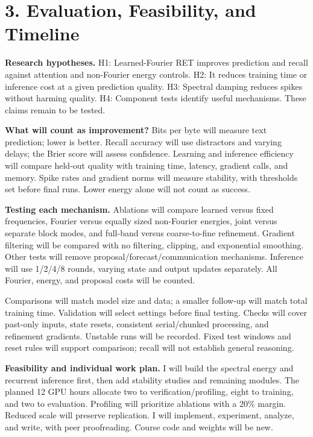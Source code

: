 \documentclass[11pt,letterpaper]{article}
\begin{document}
\newpage
\section*{3. Evaluation, Feasibility, and Timeline}

\textbf{Research hypotheses.} H1: Learned-Fourier RET improves prediction and recall against attention and non-Fourier energy controls. H2: It reduces training time or inference cost at a given prediction quality. H3: Spectral damping reduces spikes without harming quality. H4: Component tests identify useful mechanisms. These claims remain to be tested.

\textbf{What will count as improvement?} Bits per byte will measure text prediction; lower is better. Recall accuracy will use distractors and varying delays; the Brier score will assess confidence. Learning and inference efficiency will compare held-out quality with training time, latency, gradient calls, and memory. Spike rates and gradient norms will measure stability, with thresholds set before final runs. Lower energy alone will not count as success.

\textbf{Testing each mechanism.} Ablations will compare learned versus fixed frequencies, Fourier versus equally sized non-Fourier energies, joint versus separate block modes, and full-band versus coarse-to-fine refinement. Gradient filtering will be compared with no filtering, clipping, and exponential smoothing. Other tests will remove proposal/forecast/communication mechanisms. Inference will use 1/2/4/8 rounds, varying state and output updates separately. All Fourier, energy, and proposal costs will be counted.

Comparisons will match model size and data; a smaller follow-up will match total training time. Validation will select settings before final testing. Checks will cover past-only inputs, state resets, consistent serial/chunked processing, and refinement gradients. Unstable runs will be recorded. Fixed test windows and reset rules will support comparison; recall will not establish general reasoning.

\textbf{Feasibility and individual work plan.} I will build the spectral energy and recurrent inference first, then add stability studies and remaining modules. The planned 12 GPU hours allocate two to verification/profiling, eight to training, and two to evaluation. Profiling will prioritize ablations with a 20\% margin. Reduced scale will preserve replication. I will implement, experiment, analyze, and write, with peer proofreading. Course code and weights will be new.
\end{document}
